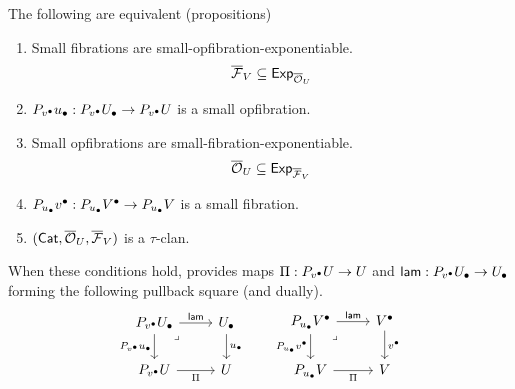 \begin{theorem}\label{thm:pi-equiv-defs}
  The following are equivalent (propositions)
  \begin{enumerate}
    \item Small fibrations are small-opfibration-exponentiable. \[{\overline{{\mathcal{F}}}}_V \subseteq \mathsf{Exp}_{{\overline{{\mathcal{O}}}}_U}\]
    \item $P_{v^\bullet} {u_\bullet} : P_{v^\bullet} {U_\bullet} \to P_{v^\bullet} U$ is a small opfibration.
    \item Small opfibrations are small-fibration-exponentiable. \[{\overline{{\mathcal{O}}}}_U \subseteq \mathsf{Exp}_{{\overline{{\mathcal{F}}}}_V}\]
    \item $P_{u_\bullet} {v^\bullet} : P_{u_\bullet} {V^\bullet} \to P_{u_\bullet} V$ is a small fibration.
    \item $(\mathsf{Cat},{\overline{{\mathcal{O}}}}_U, {\overline{{\mathcal{F}}}}_V)$ is a $\tau$-clan.
  \end{enumerate}
  When these conditions hold,
   provides maps
  $\Pi : P_{v^\bullet} U \to U$ and $\mathop{\mathsf{lam}} : P_{v^\bullet} {U_\bullet} \to {U_\bullet}$
  forming the following pullback square (and dually).
\begin{equation}\label{eq:fib-algebraic-pi}
\begin{tikzcd}
	{P_\vlow \Ulow} & \Ulow \\
	{P_\vlow \U} & \U
	\arrow["\lam", from=1-1, to=1-2]
	\arrow["{P_\vlow \ulow}"', from=1-1, to=2-1]
	\arrow["\lrcorner"{anchor=center, pos=0.125}, draw=none, from=1-1, to=2-2]
	\arrow["\ulow", from=1-2, to=2-2]
	\arrow["\Pi"', from=2-1, to=2-2]
\end{tikzcd}
\quad \quad
\begin{tikzcd}
	{P_\ulow \Vlow} & \Vlow \\
	{P_\ulow \V} & \V
	\arrow["\lam", from=1-1, to=1-2]
	\arrow["{P_\ulow \vlow}"', from=1-1, to=2-1]
	\arrow["\lrcorner"{anchor=center, pos=0.125}, draw=none, from=1-1, to=2-2]
	\arrow["\vlow", from=1-2, to=2-2]
	\arrow["\Pi"', from=2-1, to=2-2]
\end{tikzcd}
\end{equation}
\end{theorem}
